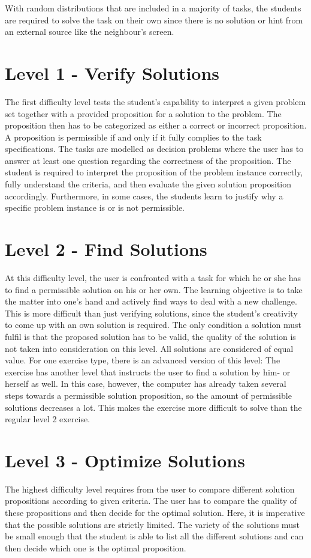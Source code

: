 With random distributions that are included in a majority of tasks, the students are required to solve the task on their own since there is no solution or hint from an external source like the neighbour's screen.


\section{Level 1 - Verify Solutions}
\label{section:verify}
The first difficulty level tests the student's capability to interpret a given problem set together with a provided proposition for a solution to the problem. The proposition then has to be categorized as either a correct or incorrect proposition. A proposition is permissible if and only if it fully complies to the task specifications. The tasks are modelled as decision problems where the user has to answer at least one question regarding the correctness of the proposition. The student is required to interpret the proposition of the problem instance correctly, fully understand the criteria, and then evaluate the given solution proposition accordingly. Furthermore, in some cases, the students learn to justify why a specific problem instance is or is not permissible.

\section{Level 2 - Find Solutions}
\label{section:find}
At this difficulty level, the user is confronted with a task for which he or she has to find a permissible solution on his or her own. The learning objective is to take the matter into one's hand and actively find ways to deal with a new challenge. This is more difficult than just verifying solutions, since the student's creativity to come up with an own solution is required. The only condition a solution must fulfil is that the proposed solution has to be valid, the quality of the solution is not taken into consideration on this level. All solutions are considered of equal value.
For one exercise type, there is an advanced version of this level: The   exercise has another level that instructs the user to find a solution by him- or herself as well. In this case, however, the computer has already taken several steps towards a permissible solution proposition, so the amount of permissible solutions decreases a lot. This makes the exercise more difficult to solve than the regular level 2 exercise.

\newpage
\section{Level 3 - Optimize Solutions}
\label{section:optimize}
The highest difficulty level requires from the user to compare different solution propositions according to given criteria. The user has to compare the quality of these propositions and then decide for the optimal solution. Here, it is imperative that the possible solutions are strictly limited. The variety of the solutions must be small enough that the student is able to list all the different solutions and can then decide which one is the optimal proposition.